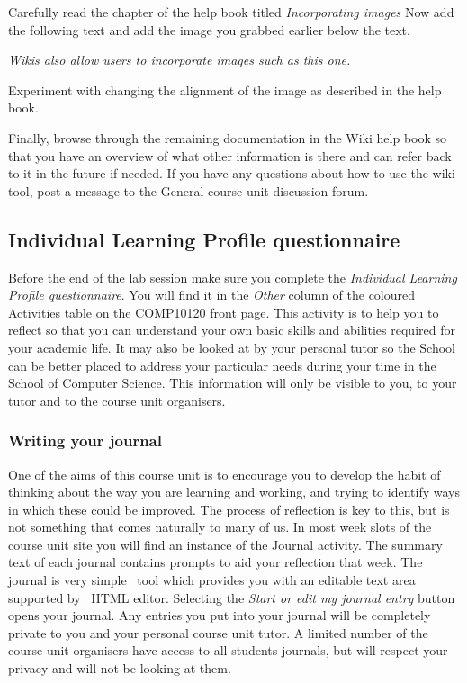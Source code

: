 Carefully read the chapter of the help book titled \emph{Incorporating images}  Now add the following text and add the image you grabbed earlier below the text.

\emph{Wikis also allow users to incorporate images such as this one.} 

Experiment with changing the alignment of the image as described in the help book.

Finally, browse through the remaining documentation in the Wiki help book so that you have an overview of what other information is there and can refer back to it in the future if needed. If you have any questions about how to use the wiki tool, post a message to the General course unit discussion forum.

\subsection{Individual Learning Profile questionnaire}
\label{sec:indiv-learn-prof}

Before the end of the lab session make sure you complete the \emph{Individual Learning Profile questionnaire}. You will find it in the \emph{Other} column of the coloured Activities table on the COMP10120 front page. This activity is to help you to reflect so that you can understand your own basic skills and abilities required for your academic life. It may also be looked at by your personal tutor so the School can be better placed to address your particular needs during your time in the School of Computer Science. This information will only be visible to you, to your tutor and to the course unit organisers.

\subsubsection*{Writing your journal}
\label{sec:writing-your-journal}


One of the aims of this course unit is to encourage you to develop the habit of thinking about the way you are learning and working, and trying to identify ways in which these could be improved. The process of reflection is key to this, but is not something that comes naturally to many of us. In most week slots of the course unit site you will find an instance of the Journal activity. The summary text of each journal contains prompts to aid your reflection that week. The journal is very simple \moodle\ tool which provides you with an editable text area supported by \moodle\ HTML editor. Selecting the \emph{Start or edit my journal entry} button opens your journal. Any entries you put into your journal will be completely private to you and your personal course unit tutor. A limited number of the course unit organisers have access to all students journals, but will respect your privacy and will not be looking at them.


